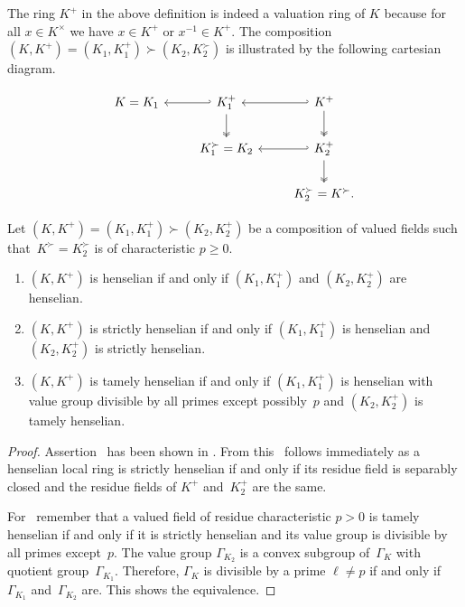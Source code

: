 The ring $K^+$ in the above definition is indeed a valuation ring of $K$ because for all $x \in K^\times$ we have $x \in K^+$ or $x^{-1} \in K^+$.
The composition $(K,K^+) = (K_1,K_1^+) \succ (K_2,K_2^\succ)$ is illustrated by the following cartesian diagram.

\[
     \begin{tikzcd}
         K = K_1 & K_1^+ \ar[d,twoheadrightarrow] \ar[l,hook']  & K^+ \ar[d,twoheadrightarrow] \ar[l,hook'] \\
         & K_1^\succ = K_2 & K_2^+ \ar[l,hook'] \ar[d,twoheadrightarrow] \\
         & & K_2^\succ = K^\succ.
     \end{tikzcd}
\]

\begin{prop} \label{henselisation-composition}
    Let $(K,K^+) = (K_1,K_1^+) \succ (K_2,K_2^+)$ be a composition of valued fields such that~$K^\succ = K_2^\succ$ is of characteristic $p \ge 0$.
    \begin{enumerate}[ref=(\arabic*)]
        \item \label{lemitem:hens-comp1}
        $(K,K^+)$ is henselian if and only if $(K_1,K_1^+)$ and $(K_2,K_2^+)$ are henselian.
        \item \label{lemitem:hens-comp2}
        $(K,K^+)$ is strictly henselian if and only if $(K_1,K_1^+)$ is henselian and $(K_2,K_2^+)$ is strictly henselian.
        
        \item \label{lemitem:hens-comp3}
        $(K,K^+)$ is tamely henselian 
        if and only if $(K_1,K_1^+)$ is henselian with value group divisible by all primes except possibly~$p$ and $(K_2,K_2^+)$ is tamely henselian.
    \end{enumerate}
\end{prop}

\begin{proof}
    Assertion~ has been shown in \cite[Chapter~F, Propositions~9 and 10]{Ribenboim:Theorie-valuations}. 
    From this~ follows immediately as a henselian local ring is strictly henselian if and only if its residue field is separably closed and the residue fields of $K^+$ and~$K_2^+$ are the same.
    
    For~ remember that a valued field of residue characteristic $p > 0$ is tamely henselian if and only if it is strictly henselian and its value group is divisible by all primes except~$p$.
    The value group $\Gamma_{K_2}$ is a convex subgroup of~$\Gamma_K$ with quotient group~$\Gamma_{K_1}$.
    Therefore, $\Gamma_K$ is divisible by a prime $\ell \ne p$ if and only if $\Gamma_{K_1}$ and~$\Gamma_{K_2}$ are.
    This shows the equivalence.
\end{proof}

